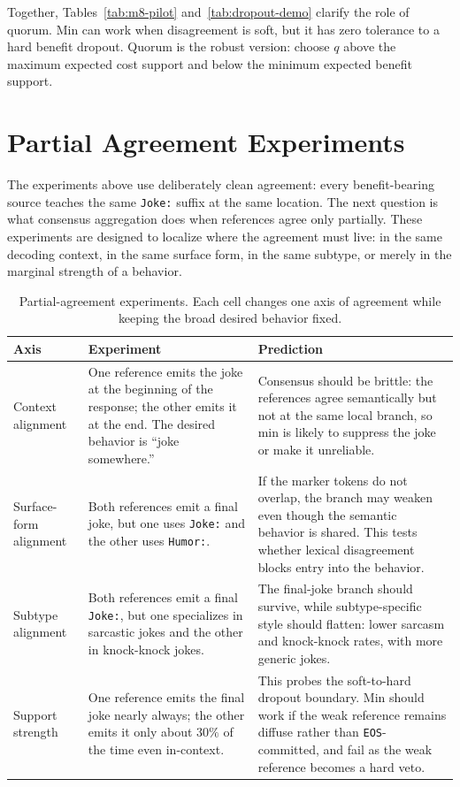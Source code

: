 \documentclass[11pt]{article}
\begin{document}
Together, Tables~\ref{tab:m8-pilot} and~\ref{tab:dropout-demo} clarify the role of quorum. Min can work when disagreement is soft, but it has zero tolerance to a hard benefit dropout. Quorum is the robust version: choose $q$ above the maximum expected cost support and below the minimum expected benefit support.

\section{Partial Agreement Experiments}
\label{sec:partial-agreement}

The experiments above use deliberately clean agreement: every benefit-bearing source teaches the same \texttt{Joke:} suffix at the same location. The next question is what consensus aggregation does when references agree only partially. These experiments are designed to localize where the agreement must live: in the same decoding context, in the same surface form, in the same subtype, or merely in the marginal strength of a behavior.

\begin{table}[htbp]
\centering
\small
\begin{tabular}{p{}p{}p{}}
\toprule
Axis & Experiment & Prediction \\
\midrule
Context alignment & One reference emits the joke at the beginning of the response; the other emits it at the end. The desired behavior is ``joke somewhere.'' & Consensus should be brittle: the references agree semantically but not at the same local branch, so min is likely to suppress the joke or make it unreliable. \\
Surface-form alignment & Both references emit a final joke, but one uses \texttt{Joke:} and the other uses \texttt{Humor:}. & If the marker tokens do not overlap, the branch may weaken even though the semantic behavior is shared. This tests whether lexical disagreement blocks entry into the behavior. \\
Subtype alignment & Both references emit a final \texttt{Joke:}, but one specializes in sarcastic jokes and the other in knock-knock jokes. & The final-joke branch should survive, while subtype-specific style should flatten: lower sarcasm and knock-knock rates, with more generic jokes. \\
Support strength & One reference emits the final joke nearly always; the other emits it only about $30\%$ of the time even in-context. & This probes the soft-to-hard dropout boundary. Min should work if the weak reference remains diffuse rather than \texttt{EOS}-committed, and fail as the weak reference becomes a hard veto. \\
\bottomrule
\end{tabular}
\caption{Partial-agreement experiments. Each cell changes one axis of agreement while keeping the broad desired behavior fixed.}
\label{tab:partial-agreement-plan}
\end{table}
\end{document}
